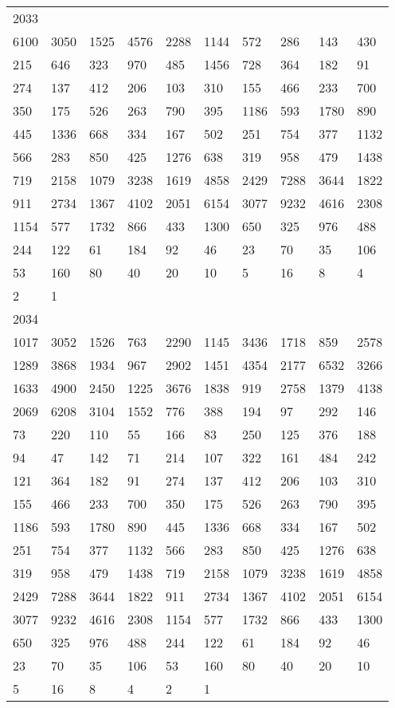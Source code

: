 \begin{longtable}{*{10}{l}}
2033&&&&&&&&&\\
6100& 3050& 1525& 4576& 2288& 1144& 572& 286& 143& 430\\
215& 646& 323& 970& 485& 1456& 728& 364& 182& 91\\
274& 137& 412& 206& 103& 310& 155& 466& 233& 700\\
350& 175& 526& 263& 790& 395& 1186& 593& 1780& 890\\
445& 1336& 668& 334& 167& 502& 251& 754& 377& 1132\\
566& 283& 850& 425& 1276& 638& 319& 958& 479& 1438\\
719& 2158& 1079& 3238& 1619& 4858& 2429& 7288& 3644& 1822\\
911& 2734& 1367& 4102& 2051& 6154& 3077& 9232& 4616& 2308\\
1154& 577& 1732& 866& 433& 1300& 650& 325& 976& 488\\
244& 122& 61& 184& 92& 46& 23& 70& 35& 106\\
53& 160& 80& 40& 20& 10& 5& 16& 8& 4\\
2& 1& \\

2034&&&&&&&&&\\
1017& 3052& 1526& 763& 2290& 1145& 3436& 1718& 859& 2578\\
1289& 3868& 1934& 967& 2902& 1451& 4354& 2177& 6532& 3266\\
1633& 4900& 2450& 1225& 3676& 1838& 919& 2758& 1379& 4138\\
2069& 6208& 3104& 1552& 776& 388& 194& 97& 292& 146\\
73& 220& 110& 55& 166& 83& 250& 125& 376& 188\\
94& 47& 142& 71& 214& 107& 322& 161& 484& 242\\
121& 364& 182& 91& 274& 137& 412& 206& 103& 310\\
155& 466& 233& 700& 350& 175& 526& 263& 790& 395\\
1186& 593& 1780& 890& 445& 1336& 668& 334& 167& 502\\
251& 754& 377& 1132& 566& 283& 850& 425& 1276& 638\\
319& 958& 479& 1438& 719& 2158& 1079& 3238& 1619& 4858\\
2429& 7288& 3644& 1822& 911& 2734& 1367& 4102& 2051& 6154\\
3077& 9232& 4616& 2308& 1154& 577& 1732& 866& 433& 1300\\
650& 325& 976& 488& 244& 122& 61& 184& 92& 46\\
23& 70& 35& 106& 53& 160& 80& 40& 20& 10\\
5& 16& 8& 4& 2& 1& \\


\end{longtable}

